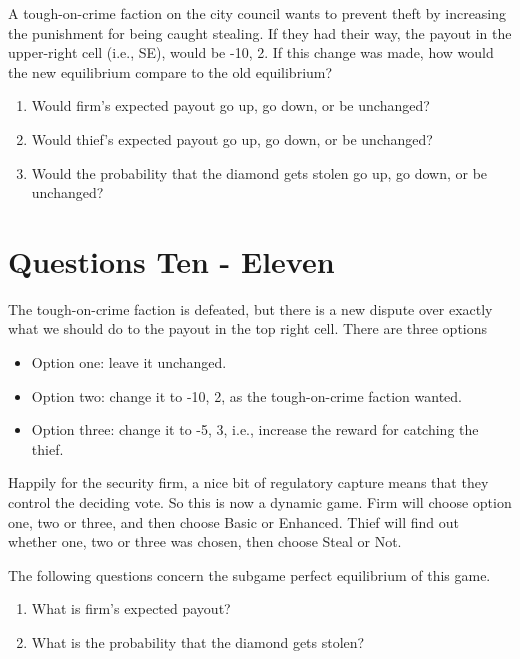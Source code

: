 \documentclass[11pt,]{article}
\providecommand{\tightlist}{%
  \setlength{\itemsep}{0pt}\setlength{\parskip}{0pt}}
\begin{document}
A tough-on-crime faction on the city council wants to prevent theft by
increasing the punishment for being caught stealing. If they had their
way, the payout in the upper-right cell (i.e., SE), would be -10, 2. If
this change was made, how would the new equilibrium compare to the old
equilibrium?

\begin{enumerate}
\def\labelenumi{\arabic{enumi}.}
\setcounter{enumi}{6}
\tightlist
\item
  Would firm's expected payout go up, go down, or be unchanged?
\item
  Would thief's expected payout go up, go down, or be unchanged?
\item
  Would the probability that the diamond gets stolen go up, go down, or
  be unchanged?
\end{enumerate}

\hypertarget{questions-ten---eleven}{%
\section{Questions Ten - Eleven}\label{questions-ten---eleven}}

The tough-on-crime faction is defeated, but there is a new dispute over
exactly what we should do to the payout in the top right cell. There are
three options

\begin{itemize}
\tightlist
\item
  Option one: leave it unchanged.
\item
  Option two: change it to -10, 2, as the tough-on-crime faction wanted.
\item
  Option three: change it to -5, 3, i.e., increase the reward for
  catching the thief.
\end{itemize}

Happily for the security firm, a nice bit of regulatory capture means
that they control the deciding vote. So this is now a dynamic game. Firm
will choose option one, two or three, and then choose Basic or Enhanced.
Thief will find out whether one, two or three was chosen, then choose
Steal or Not.

The following questions concern the subgame perfect equilibrium of this
game.

\begin{enumerate}
\def\labelenumi{\arabic{enumi}.}
\setcounter{enumi}{9}
\tightlist
\item
  What is firm's expected payout?
\item
  What is the probability that the diamond gets stolen?
\end{enumerate}
\end{document}
